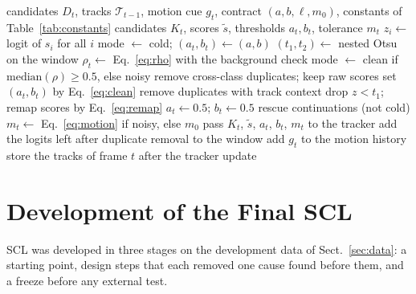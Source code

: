 \documentclass[pdflatex,sn-mathphys-num,iicol]{sn-jnl}
\newcommand{\scl}{SCL}
\begin{document}
\begin{algorithm}[t]
\caption{\scl{} for frame $t$. The window holds the logits of frames
$t-W$ to $t-1$, so the decision for frame $t$ uses no future frame.}\label{alg:layer}
\begin{algorithmic}[1]
\Require candidates $D_t$, tracks $\mathcal{T}_{t-1}$, motion cue $g_t$, contract $(a,b,\ell,m_0)$, constants of Table~\ref{tab:constants}
\Ensure candidates $K_t$, scores $\tilde{s}$, thresholds $a_t,b_t$, tolerance $m_t$
\State $z_i\gets$ logit of $s_i$ for all $i$ 
 
  \State mode $\gets$ cold; $(a_t,b_t)\gets(a,b)$
\Else
  \State $(t_1,t_2)\gets$ nested Otsu on the window 
  \State $\rho_t\gets$ Eq.~\eqref{eq:rho} with the background check
  \State mode $\gets$ clean if $\mathrm{median}(\rho)\ge0.5$, else noisy
\EndIf
{} 
  \State remove cross-class duplicates; keep raw scores
   set $(a_t,b_t)$ by Eq.~\eqref{eq:clean}
  \EndIf
\Else {}
  \State remove duplicates with track context
  \State drop $z<t_1$; remap scores by Eq.~\eqref{eq:remap}
  \State $a_t\gets0.5$; $b_t\gets0.5$
\EndIf
\State rescue continuations (not cold) 
\State $m_t\gets$ Eq.~\eqref{eq:motion} if noisy, else $m_0$
\State pass $K_t$, $\tilde{s}$, $a_t$, $b_t$, $m_t$ to the tracker
\State add the logits left after duplicate removal to the window
\State add $g_t$ to the motion history
\State store the tracks of frame $t$ after the tracker update
\end{algorithmic}
\end{algorithm}
\section{Development of the Final SCL}\label{sec:development}

\scl{} was developed in three stages on the development data of Sect.~\ref{sec:data}: a starting
point, design steps that each removed one cause found before them, and a freeze before any external
test.
\end{document}
